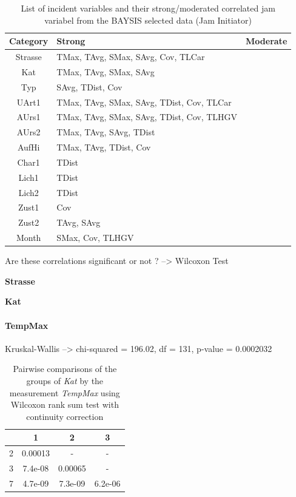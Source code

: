 \documentclass[a4paper,headsepline,footsepline,fontsize=11pt,BCOR=12mm,DIV=12]{report}
\begin{document}
\noindent
\begin{table}[h]
	\centering
	\begin{tabular}{c|l|l}  
		\toprule
		\textbf{Category} & \textbf{Strong} & \textbf{Moderate} \\
		\midrule
		Strasse & TMax, TAvg, SMax, SAvg, Cov, TLCar & \\ 
 		Kat & TMax, TAvg, SMax, SAvg & \\ 
 		Typ & SAvg, TDist, Cov & \\
 		UArt1 & TMax, TAvg, SMax, SAvg, TDist, Cov, TLCar & \\
 		AUrs1 & TMax, TAvg, SMax, SAvg, TDist, Cov, TLHGV & \\
 		AUrs2 & TMax, TAvg, SAvg, TDist & \\
 		AufHi & TMax, TAvg, TDist, Cov & \\
 		Char1 & TDist & \\
 		Lich1 & TDist & \\
 		Lich2 & TDist & \\
 		Zust1 & Cov & \\
 		Zust2 & TAvg, SAvg & \\
 		Month & SMax, Cov, TLHGV & \\
 		\bottomrule
	\end{tabular}
	\caption{List of incident variables and their strong/moderated correlated jam variabel from the BAYSIS selected data (Jam Initiator)}
\end{table}

Are these correlations significant or not ? --> Wilcoxon Test

\large
\centerline{\textbf{Strasse}}
\normalsize

\centerline{\textbf{Kat}}

\paragraph{TempMax}

Kruskal-Wallis --> chi-squared = 196.02, df = 131, p-value = 0.0002032

\begin{table}[h]
	\centering
	\begin{tabular}{c|c|c|c}
		\toprule  
  		& 1 & 2 & 3 \\ 
  		\midrule    
		2 & 0.00013 & -       & -   \\   
		\midrule
		3 & 7.4e-08 & 0.00065 & -     \\ 
		\midrule
		7 & 4.7e-09 & 7.3e-09 & 6.2e-06 \\
 		\bottomrule
	\end{tabular}
	\caption{Pairwise comparisons of the groups of \textit{Kat} by the measurement \textit{TempMax} using Wilcoxon rank sum test with continuity correction}
\end{table}
\end{document}
